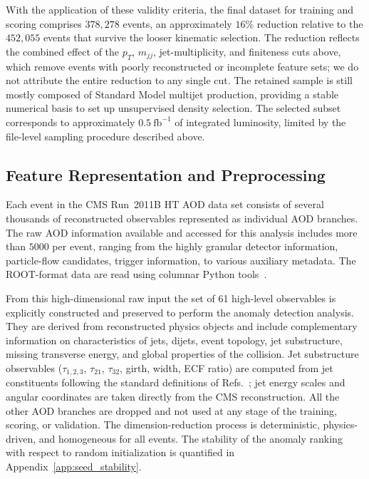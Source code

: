 \documentclass[11pt,a4paper,twocolumn]{article}
\begin{document}
With the application of these validity criteria, the final dataset for training and scoring comprises $378{,}278$ events, an approximately $16\%$ reduction relative to the $452{,}055$ events that survive the looser kinematic selection. The reduction reflects the combined effect of the $p_T$, $m_{jj}$, jet-multiplicity, and finiteness cuts above, which remove events with poorly reconstructed or incomplete feature sets; we do not attribute the entire reduction to any single cut. The retained sample is still mostly composed of Standard Model multijet production, providing a stable numerical basis to set up unsupervised density selection. The selected subset corresponds to approximately $0.5~\mathrm{fb}^{-1}$ of integrated luminosity, limited by the file-level sampling procedure described above.
\subsection{Feature Representation and Preprocessing}

Each event in the CMS Run~2011B HT AOD data set consists of several thousands of reconstructed observables represented as individual AOD branches. The raw AOD information available and accessed for this analysis includes more than $5000$ per event, ranging from the highly granular detector information, particle-flow candidates, trigger information, to various auxiliary metadata. The ROOT-format data are read using columnar Python tools~\cite{Brun1997ROOT,Pivarski2020Uproot}.

From this high-dimensional raw input the set of 61 high-level observables is explicitly constructed and preserved to perform the anomaly detection analysis. They are derived from reconstructed physics objects and include complementary information on characteristics of jets, dijets, event topology, jet substructure, missing transverse energy, and global properties of the collision. Jet substructure observables ($\tau_{1,2,3}$, $\tau_{21}$, $\tau_{32}$, girth, width, ECF ratio) are computed from jet constituents following the standard definitions of Refs.~\cite{Thaler2011NSubjettiness,Larkoski2013ECF}; jet energy scales and angular coordinates are taken directly from the CMS reconstruction. All the other AOD branches are dropped and not used at any stage of the training, scoring, or validation. The dimension-reduction process is deterministic, physics-driven, and homogeneous for all events.
The stability of the anomaly ranking with respect to random initialization is quantified in Appendix~\ref{app:seed_stability}.
\end{document}
